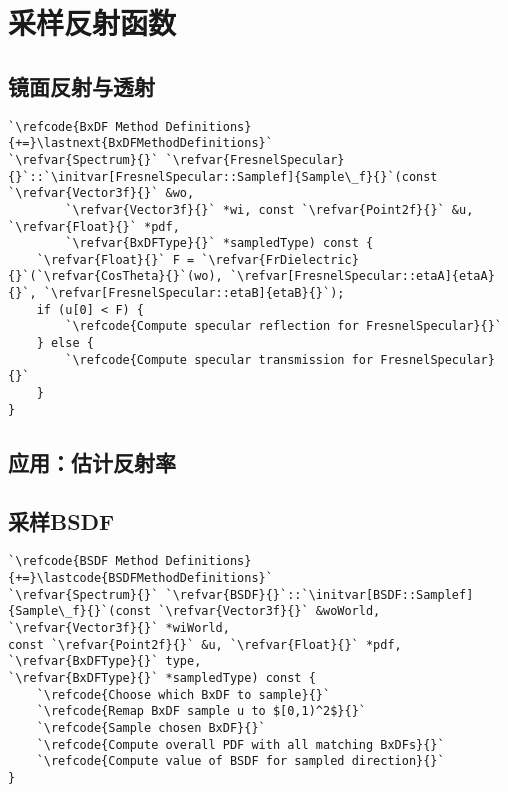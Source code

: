 \section{采样反射函数}\label{sec:采样反射函数}

\subsection{镜面反射与透射}\label{sub:镜面反射与透射}
\begin{lstlisting}
`\refcode{BxDF Method Definitions}{+=}\lastnext{BxDFMethodDefinitions}`
`\refvar{Spectrum}{}` `\refvar{FresnelSpecular}{}`::`\initvar[FresnelSpecular::Samplef]{Sample\_f}{}`(const `\refvar{Vector3f}{}` &wo,
        `\refvar{Vector3f}{}` *wi, const `\refvar{Point2f}{}` &u, `\refvar{Float}{}` *pdf,
        `\refvar{BxDFType}{}` *sampledType) const {
    `\refvar{Float}{}` F = `\refvar{FrDielectric}{}`(`\refvar{CosTheta}{}`(wo), `\refvar[FresnelSpecular::etaA]{etaA}{}`, `\refvar[FresnelSpecular::etaB]{etaB}{}`);
    if (u[0] < F) {
        `\refcode{Compute specular reflection for FresnelSpecular}{}`
    } else {
        `\refcode{Compute specular transmission for FresnelSpecular}{}`
    }
}
\end{lstlisting}
\subsection{应用：估计反射率}\label{sub:应用：估计反射率}
\subsection{采样BSDF}\label{sub:采样BSDF}
\begin{lstlisting}
`\refcode{BSDF Method Definitions}{+=}\lastcode{BSDFMethodDefinitions}`
`\refvar{Spectrum}{}` `\refvar{BSDF}{}`::`\initvar[BSDF::Samplef]{Sample\_f}{}`(const `\refvar{Vector3f}{}` &woWorld, `\refvar{Vector3f}{}` *wiWorld,
const `\refvar{Point2f}{}` &u, `\refvar{Float}{}` *pdf, `\refvar{BxDFType}{}` type,
`\refvar{BxDFType}{}` *sampledType) const {
    `\refcode{Choose which BxDF to sample}{}`
    `\refcode{Remap BxDF sample u to $[0,1)^2$}{}`
    `\refcode{Sample chosen BxDF}{}`
    `\refcode{Compute overall PDF with all matching BxDFs}{}`
    `\refcode{Compute value of BSDF for sampled direction}{}`
}
\end{lstlisting}